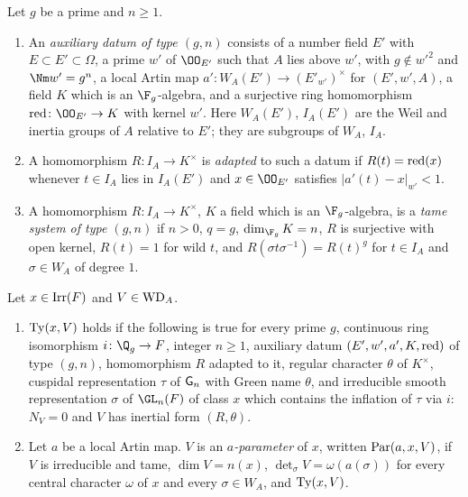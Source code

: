 \begin{definition}\label{pf:llc:def-ext}
Let $g$ be a prime and $n\ge1$.
\begin{enumerate}[label=(\alph*)]
\item An \emph{auxiliary datum of type $(g,n)$} consists of a number field $E'$ with $E\subset E'\subset\Omega$, a
  prime $w'$ of $\OO_{E'}$ such that $A$ lies above $w'$, with $g\notin w'^2$ and $\Nm w'=g^n$, a local Artin map
  $a'\colon W_A(E')\to(E'_{w'})^\times$ for $(E',w',A)$, a field $K$ which is an $\F_g$-algebra, and a surjective
  ring homomorphism $\llcred\colon\OO_{E'}\to K$ with kernel $w'$. Here $W_A(E')$, $I_A(E')$ are the Weil and
  inertia groups of $A$ relative to $E'$; they are subgroups of $W_A$, $I_A$.
\item A homomorphism $R\colon I_A\to K^\times$ is \emph{adapted} to such a datum if $R(t)=\operatorname{red}(x)$ whenever
  $t\in I_A$ lies in $I_A(E')$ and $x\in\OO_{E'}$ satisfies $|a'(t)-x|_{w'}<1$.
\item A homomorphism $R\colon I_A\to K^\times$, $K$ a field which is an $\F_g$-algebra, is a \emph{tame system of type
  $(g,n)$} if $n>0$, $q=g$, $\dim_{\F_g}K=n$, $R$ is surjective with open kernel, $R(t)=1$ for wild $t$, and
  $R(\sigma t\sigma^{-1})=R(t)^g$ for $t\in I_A$ and $\sigma\in W_A$ of degree $1$.
\end{enumerate}
\end{definition}

\begin{definition}\label{pf:llc:def-par}
Let $x\in\operatorname{Irr}(F)$ and $V\in\mathrm{WD}_A$.
\begin{enumerate}[label=(\alph*)]
\item $\operatorname{Ty}(x,V)$ holds if the following is true for every prime $g$, continuous ring isomorphism
  $i\colon\Q_g\to F$, integer $n\ge1$, auxiliary datum $(E',w',a',K,\operatorname{red})$ of type $(g,n)$, homomorphism
  $R$ adapted to it, regular character $\theta$ of $K^\times$, cuspidal representation $\tau$ of $\mathsf{G}_n$
  with Green name $\theta$, and irreducible smooth representation $\sigma$ of $\GL_n(F)$ of class $x$ which
  contains the inflation of $\tau$ via $i$: $N_V=0$ and $V$ has inertial form $(R,\theta)$.
\item Let $a$ be a local Artin map. $V$ is an \emph{$a$-parameter} of $x$, written $\operatorname{Par}(a,x,V)$, if $V$ is
  irreducible and tame, $\dim V=n(x)$, $\det_\sigma V=\omega(a(\sigma))$ for every central character $\omega$
  of $x$ and every $\sigma\in W_A$, and $\operatorname{Ty}(x,V)$.
\end{enumerate}
\end{definition}

